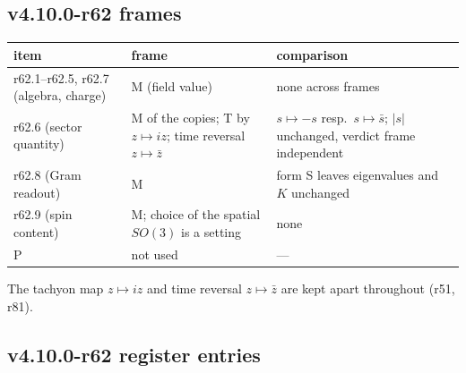 \subsection*{v4.10.0-r62 frames}
\label{subsec:v4100-r62-frames}

\begin{center}
\small
\begin{tabular}{@{}>{\raggedright\arraybackslash}p{}>{\raggedright\arraybackslash}p{}>{\raggedright\arraybackslash}p{}@{}}
\toprule
item & frame & comparison\\
\midrule
r62.1--r62.5, r62.7 (algebra, charge) & M (field value) & none across frames\\
r62.6 (sector quantity) & M of the copies; T by \(z\mapsto iz\); time reversal \(z\mapsto\bar z\) & \(s\mapsto-s\) resp.\ \(s\mapsto\bar s\); \(|s|\) unchanged, verdict frame independent\\
r62.8 (Gram readout) & M & form S leaves eigenvalues and \(K\) unchanged\\
r62.9 (spin content) & M; choice of the spatial \(SO(3)\) is a setting & none\\
P & not used & ---\\
\bottomrule
\end{tabular}
\end{center}
The tachyon map \(z\mapsto iz\) and time reversal \(z\mapsto\bar z\) are kept apart throughout (r51, r81).

\subsection*{v4.10.0-r62 register entries}
\label{subsec:v4100-r62-register}

